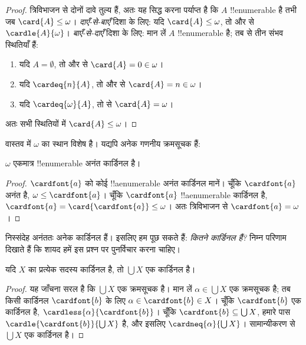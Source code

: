 \documentclass[../../../include/open-logic-section]{subfiles}
\begin{document}
\begin{proof}
त्रिविभाजन से दोनों दावे तुल्य हैं, अतः यह सिद्ध करना पर्याप्त है कि $A$
!!{enumerable} है तभी जब $\card{A}\leq\omega$। \emph{दाएँ-से-बाएँ} दिशा
के लिए: यदि $\card{A}\leq\omega$, तो
 और
 से $\cardle{A}{\omega}$। \emph{बाएँ-से-दाएँ}
दिशा के लिए: मान लें $A$ !!{enumerable} है; तब
 से तीन संभव स्थितियाँ हैं:
\begin{enumerate}
	\item यदि $A=\emptyset$, तो  और
	 से
	$\card{A}=0\in\omega$।
	\item यदि $\cardeq{n}{A}$, तो  और
	 से
	$\card{A}=n\in\omega$।
	\item यदि $\cardeq{\omega}{A}$, तो  से
	$\card{A}=\omega$।
\end{enumerate}
अतः सभी स्थितियों में $\card{A}\leq\omega$।
\end{proof}
\noindent
वास्तव में $\omega$ का स्थान विशेष है। यद्यपि अनेक गणनीय क्रमसूचक हैं:

\begin{cor}
$\omega$ एकमात्र !!{enumerable} अनंत कार्डिनल है।
\end{cor}

\begin{proof}
$\cardfont{a}$ को कोई !!a{enumerable} अनंत कार्डिनल मानें। चूँकि
$\cardfont{a}$ अनंत है, $\omega\leq\cardfont{a}$। चूँकि $\cardfont{a}$
!!a{enumerable} कार्डिनल है,
$\cardfont{a}=\card{\cardfont{a}}\leq\omega$। अतः त्रिविभाजन से
$\cardfont{a}=\omega$। \end{proof}

निस्संदेह अनंततः अनेक कार्डिनल हैं। इसलिए हम पूछ सकते हैं:
\emph{कितने कार्डिनल हैं?} निम्न परिणाम दिखाते हैं कि शायद हमें इस प्रश्न
पर पुनर्विचार करना चाहिए।

\begin{prop}
यदि $X$ का प्रत्येक सदस्य कार्डिनल है, तो $\bigcup X$ एक कार्डिनल है।
\end{prop}

\begin{proof}
यह जाँचना सरल है कि $\bigcup X$ एक क्रमसूचक है। मान लें $\alpha\in
\bigcup X$ एक क्रमसूचक है; तब किसी कार्डिनल $\cardfont{b}$ के लिए
$\alpha\in\cardfont{b}\in X$। चूँकि $\cardfont{b}$ एक कार्डिनल है,
$\cardless{\alpha}{\cardfont{b}}$। चूँकि
$\cardfont{b}\subseteq\bigcup X$, हमारे पास
$\cardle{\cardfont{b}}{\bigcup X}$ है, और इसलिए
$\cardneq{\alpha}{\bigcup X}$। सामान्यीकरण से $\bigcup X$ एक कार्डिनल है।
\end{proof} 
\end{document}
